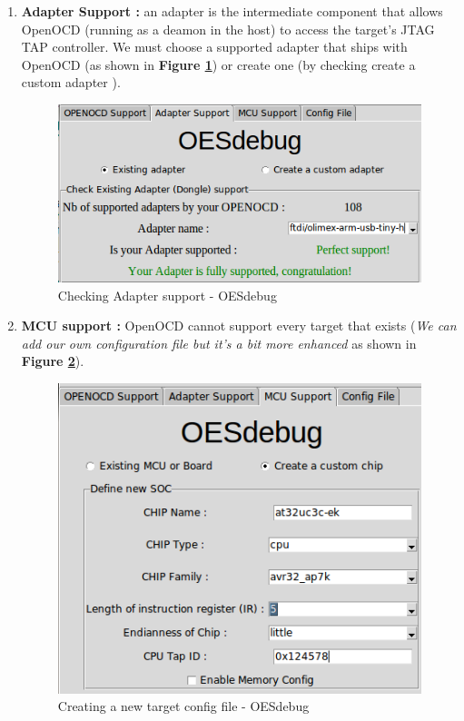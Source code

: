 \begin{enumerate}
\begin{enumerate}
			
		\item \textbf{Adapter Support : } an adapter is the intermediate component that allows OpenOCD (running as a deamon in the host) to access the target's JTAG TAP controller. We must choose a supported adapter that ships with OpenOCD (as shown in \textbf{Figure \ref{Checking Adapter support - OESdebug}}) or create one (by checking \og create a custom adapter \fg).
		\begin{figure}[H]
			\centering
        	\includegraphics[scale=0.45]{img/solution/OESdebug-adapterSupport.png}
        	\caption{Checking Adapter support - OESdebug}
        	\label{Checking Adapter support - OESdebug}
    	\end{figure}
    			
		\item \textbf{MCU support : } OpenOCD cannot support every target that exists (\textit{We can add our own configuration file but it's a bit more enhanced} as shown in \textbf{Figure \ref{Creating a new target config file - OESdebug}}).
		\begin{figure}[H]
			\centering
        	\includegraphics[scale=0.35]{img/solution/OESdebug-new-board.png}
        	\caption{Creating a new target config file - OESdebug}
        	\label{Creating a new target config file - OESdebug}
    	\end{figure}
    			

\end{enumerate}
\end{enumerate}
